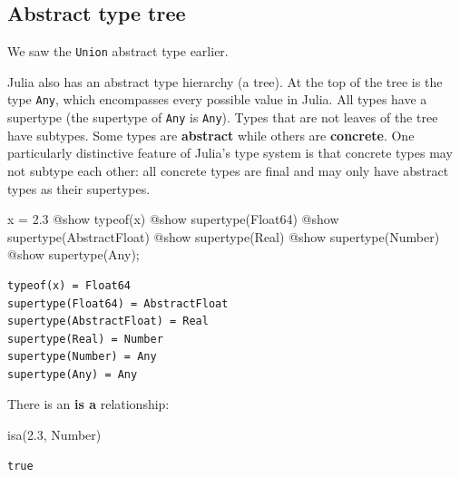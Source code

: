 \documentclass[
]{article}
\newenvironment{Shaded}{\begin{snugshade}}{\end{snugshade}}
\newcommand{\DataTypeTok}[1]{\textcolor[rgb]{0.68,0.00,0.00}{#1}}
\newcommand{\FloatTok}[1]{\textcolor[rgb]{0.68,0.00,0.00}{#1}}
\newcommand{\FunctionTok}[1]{\textcolor[rgb]{0.28,0.35,0.67}{#1}}
\newcommand{\NormalTok}[1]{\textcolor[rgb]{0.00,0.23,0.31}{#1}}
\newcommand{\OperatorTok}[1]{\textcolor[rgb]{0.37,0.37,0.37}{#1}}
\newcommand{\PreprocessorTok}[1]{\textcolor[rgb]{0.68,0.00,0.00}{#1}}
\begin{document}
\subsection{Abstract type tree}\label{abstract-type-tree}

We saw the \texttt{Union} abstract type earlier.

Julia also has an abstract type hierarchy (a tree). At the top of the
tree is the type \texttt{Any}, which encompasses every possible value in
Julia. All types have a supertype (the supertype of \texttt{Any} is
\texttt{Any}). Types that are not leaves of the tree have subtypes. Some
types are \textbf{abstract} while others are \textbf{concrete}. One
particularly distinctive feature of Julia's type system is that concrete
types may not subtype each other: all concrete types are final and may
only have abstract types as their supertypes.

\begin{Shaded}
\begin{Highlighting}[]
\NormalTok{x }\OperatorTok{=} \FloatTok{2.3}
\PreprocessorTok{@show} \FunctionTok{typeof}\NormalTok{(x)}
\PreprocessorTok{@show} \FunctionTok{supertype}\NormalTok{(}\DataTypeTok{Float64}\NormalTok{)}
\PreprocessorTok{@show} \FunctionTok{supertype}\NormalTok{(}\DataTypeTok{AbstractFloat}\NormalTok{)}
\PreprocessorTok{@show} \FunctionTok{supertype}\NormalTok{(}\DataTypeTok{Real}\NormalTok{)}
\PreprocessorTok{@show} \FunctionTok{supertype}\NormalTok{(}\DataTypeTok{Number}\NormalTok{)}
\PreprocessorTok{@show} \FunctionTok{supertype}\NormalTok{(}\DataTypeTok{Any}\NormalTok{);}
\end{Highlighting}
\end{Shaded}

\begin{verbatim}
typeof(x) = Float64
supertype(Float64) = AbstractFloat
supertype(AbstractFloat) = Real
supertype(Real) = Number
supertype(Number) = Any
supertype(Any) = Any
\end{verbatim}

There is an \textbf{is a} relationship:

\begin{Shaded}
\begin{Highlighting}[]
\FunctionTok{isa}\NormalTok{(}\FloatTok{2.3}\NormalTok{, }\DataTypeTok{Number}\NormalTok{)}
\end{Highlighting}
\end{Shaded}

\begin{verbatim}
true
\end{verbatim}
\end{document}
